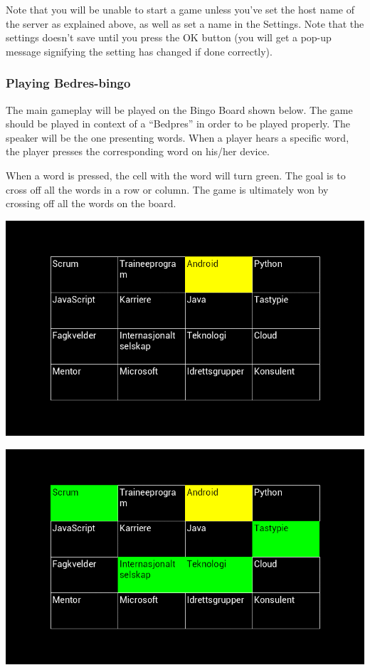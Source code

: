 Note that you will be unable to start a game unless you've set the host name of the server
as explained above, as well as set a name in the Settings. Note that the settings doesn't save
until you press the OK button (you will get a pop-up message signifying the setting has changed
if done correctly).

\subsubsection{Playing Bedres-bingo}
The main gameplay will be played on the Bingo Board shown below. The game
should be played in context of a ``Bedpres'' in order to be played properly.
The speaker will be the one presenting words. When a player hears a specific
word, the player presses the corresponding word on his/her device.

When a word is pressed, the cell with the word will turn green. The goal is to
cross off all the words in a row or column. The game is ultimately won by
crossing off all the words on the board.

\begin{center}
\includegraphics[scale=0.5]{Pikks/Board1}
\end{center}

\begin{center}
\includegraphics[scale=0.5]{Pikks/Board2}
\end{center}

